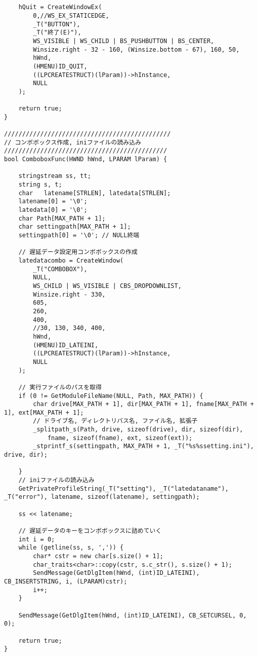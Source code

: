\begin{lstlisting}[caption=window.cpp]
	

	hQuit = CreateWindowEx(
		0,//WS_EX_STATICEDGE,
		_T("BUTTON"),
		_T("終了(E)"),
		WS_VISIBLE | WS_CHILD | BS_PUSHBUTTON | BS_CENTER,
		Winsize.right - 32 - 160, (Winsize.bottom - 67), 160, 50,
		hWnd,
		(HMENU)ID_QUIT,
		((LPCREATESTRUCT)(lParam))->hInstance,
		NULL
	);

	return true;
}

//////////////////////////////////////////////
// コンボボックス作成, iniファイルの読み込み
/////////////////////////////////////////////
bool ComboboxFunc(HWND hWnd, LPARAM lParam) {

	stringstream ss, tt;
	string s, t;
	char   latename[STRLEN], latedata[STRLEN];
	latename[0] = '\0';
	latedata[0] = '\0';
	char Path[MAX_PATH + 1];
	char settingpath[MAX_PATH + 1];
	settingpath[0] = '\0'; // NULL終端

	// 遅延データ設定用コンボボックスの作成
	latedatacombo = CreateWindow(
		_T("COMBOBOX"),
		NULL,
		WS_CHILD | WS_VISIBLE | CBS_DROPDOWNLIST,
		Winsize.right - 330,
		605,
		260,
		400,
		//30, 130, 340, 400,
		hWnd,
		(HMENU)ID_LATEINI,
		((LPCREATESTRUCT)(lParam))->hInstance,
		NULL
	);

	// 実行ファイルのパスを取得
	if (0 != GetModuleFileName(NULL, Path, MAX_PATH)) {
		char drive[MAX_PATH + 1], dir[MAX_PATH + 1], fname[MAX_PATH + 1], ext[MAX_PATH + 1];
		// ドライブ名, ディレクトリパス名, ファイル名, 拡張子
		_splitpath_s(Path, drive, sizeof(drive), dir, sizeof(dir),
			fname, sizeof(fname), ext, sizeof(ext));
		_stprintf_s(settingpath, MAX_PATH + 1, _T("%s%ssetting.ini"), drive, dir);

	}
	// iniファイルの読み込み
	GetPrivateProfileString(_T("setting"), _T("latedataname"), _T("error"), latename, sizeof(latename), settingpath);

	ss << latename;

	// 遅延データのキーをコンボボックスに詰めていく
	int i = 0;
	while (getline(ss, s, ',')) {
		char* cstr = new char[s.size() + 1];
		char_traits<char>::copy(cstr, s.c_str(), s.size() + 1);
		SendMessage(GetDlgItem(hWnd, (int)ID_LATEINI), CB_INSERTSTRING, i, (LPARAM)cstr);
		i++;
	}

	SendMessage(GetDlgItem(hWnd, (int)ID_LATEINI), CB_SETCURSEL, 0, 0);

	return true;
}
\end{lstlisting}

